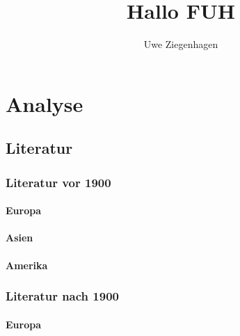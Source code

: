 \documentclass[12pt,ngerman,parskip=half]{scrreprt}
\title{Hallo FUH}
\author{Uwe Ziegenhagen}
\begin{document}
\maketitle

\tableofcontents



\chapter{Analyse}

\section{Literatur}
\subsection{Literatur vor 1900}


\subsubsection{Europa}

\blindtext 

\blindtext

\blindtext

\subsubsection{Asien}

\blindtext 

\blindtext

\blindtext

\subsubsection{Amerika}

\blindtext 

\blindtext

\blindtext

\subsection{Literatur nach 1900}

\subsubsection{Europa}

\blindtext 
\end{document}
